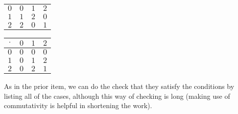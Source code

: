 \begin{exercises}
\begin{answer}
\begin{center}
\begin{tabular}{c|ccc}
             \hline
             \( 0 \) &\( 0 \) &\( 1 \) &$2$ \\
             \( 1 \) &\( 1 \) &\( 2 \) &$0$ \\
             $2$     &$2$     &$0$     &$1$
          \end{tabular}
          \qquad
          \begin{tabular}{c|ccc}
            \( \cdot \) &\( 0 \) &\( 1 \) &$2$ \\
            \hline
            \( 0 \)  &\( 0 \) &\( 0 \) &$0$ \\
            \( 1 \)  &\( 0 \) &\( 1 \) &$2$ \\
            $2$      &$0$     &$2$     &$1$
          \end{tabular}
       \end{center}
       As in the prior item, we can do the 
       check that they satisfy the conditions  
       by listing all of the cases, although this way of checking is
       long (making use of commutativity is helpful in 
       shortening the work).
     \end{answer}
\end{exercises}
%
%
